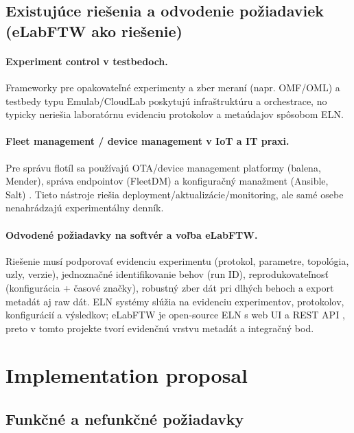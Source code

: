 \subsection{Existujúce riešenia a odvodenie požiadaviek (eLabFTW ako riešenie)}
\label{subsec:existing-solutions}

\paragraph{Experiment control v testbedoch.}
Frameworky pre opakovateľné experimenty a zber meraní (napr. OMF/OML) a testbedy typu Emulab/CloudLab
\cite{omf_home,emulab_docs,cloudlab_technology} poskytujú infraštruktúru a orchestrace, no typicky neriešia
laboratórnu evidenciu protokolov a metaúdajov spôsobom ELN.

\paragraph{Fleet management / device management v IoT a IT praxi.}
Pre správu flotíl sa používajú OTA/device management platformy (balena, Mender), správa endpointov (FleetDM) a
konfiguračný manažment (Ansible, Salt) \cite{balena_site,mender_fleet,fleetdm_site,ansible_intro,salt_intro}.
Tieto nástroje riešia deployment/aktualizácie/monitoring, ale samé osebe nenahrádzajú experimentálny denník.

\paragraph{Odvodené požiadavky na softvér a voľba eLabFTW.}
Riešenie musí podporovať evidenciu experimentu (protokol, parametre, topológia, uzly, verzie), jednoznačné identifikovanie behov (run ID),
reprodukovateľnosť (konfigurácia + časové značky), robustný zber dát pri dlhých behoch a export metadát aj raw dát.
ELN systémy slúžia na evidenciu experimentov, protokolov, konfigurácií a výsledkov; eLabFTW je open‑source ELN s web UI a REST API
\cite{elabftw_site,elabftw_github,elabftw_api_pdf}, preto v tomto projekte tvorí evidenčnú vrstvu metadát a integračný bod.

\section{Implementation proposal}
\label{sec:implementation-proposal}

\subsection{Funkčné a nefunkčné požiadavky}
\label{subsec:req}

